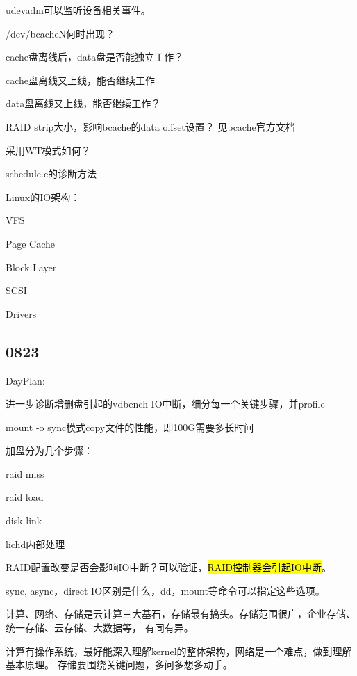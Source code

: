udevadm可以监听设备相关事件。

\begin{enumbox}
\item /dev/bcacheN何时出现？
\item cache盘离线后，data盘是否能独立工作？
\item cache盘离线又上线，能否继续工作
\item data盘离线又上线，能否继续工作？
\item RAID strip大小，影响bcache的data offset设置？ 见bcache官方文档
\item 采用WT模式如何？
\item schedule.c的诊断方法
\end{enumbox}

Linux的IO架构：
\begin{enumbox}
\item VFS
\item Page Cache
\item Block Layer
\item SCSI
\item Drivers
\end{enumbox}

\subsection{0823}

DayPlan:
\begin{enumbox}
\item 进一步诊断增删盘引起的vdbench IO中断，细分每一个关键步骤，并profile
\item mount -o sync模式copy文件的性能，即100G需要多长时间
\end{enumbox}

加盘分为几个步骤：
\begin{enumbox}
\item raid miss
\item raid load
\item disk link
\item lichd内部处理
\end{enumbox}

RAID配置改变是否会影响IO中断？可以验证，\hl{RAID控制器会引起IO中断}。

sync, async，direct IO区别是什么，dd，mount等命令可以指定这些选项。

计算、网络、存储是云计算三大基石，存储最有搞头。存储范围很广，企业存储、统一存储、云存储、大数据等，
有同有异。

计算有操作系统，最好能深入理解kernel的整体架构，网络是一个难点，做到理解基本原理。
存储要围绕关键问题，多问多想多动手。


